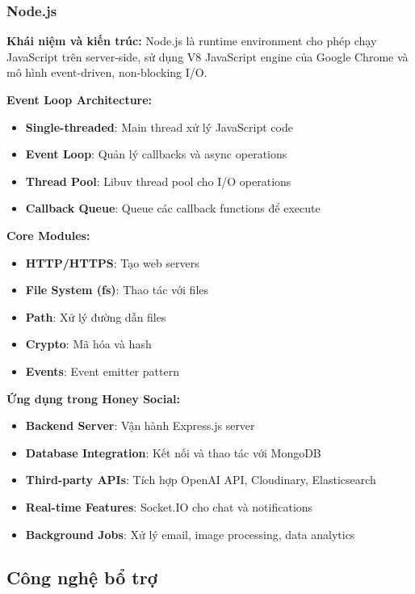 \subsubsection{Node.js}
\textbf{Khái niệm và kiến trúc:}
Node.js là runtime environment cho phép chạy JavaScript trên server-side, sử dụng V8 JavaScript engine của Google Chrome và mô hình event-driven, non-blocking I/O.

\textbf{Event Loop Architecture:}
\begin{itemize}
\item \textbf{Single-threaded}: Main thread xử lý JavaScript code
\item \textbf{Event Loop}: Quản lý callbacks và async operations
\item \textbf{Thread Pool}: Libuv thread pool cho I/O operations
\item \textbf{Callback Queue}: Queue các callback functions để execute
\end{itemize}

\textbf{Core Modules:}
\begin{itemize}
\item \textbf{HTTP/HTTPS}: Tạo web servers
\item \textbf{File System (fs)}: Thao tác với files
\item \textbf{Path}: Xử lý đường dẫn files
\item \textbf{Crypto}: Mã hóa và hash
\item \textbf{Events}: Event emitter pattern
\end{itemize}

\textbf{Ứng dụng trong Honey Social:}
\begin{itemize}
\item \textbf{Backend Server}: Vận hành Express.js server
\item \textbf{Database Integration}: Kết nối và thao tác với MongoDB
\item \textbf{Third-party APIs}: Tích hợp OpenAI API, Cloudinary, Elasticsearch
\item \textbf{Real-time Features}: Socket.IO cho chat và notifications
\item \textbf{Background Jobs}: Xử lý email, image processing, data analytics
\end{itemize}

\subsection{Công nghệ bổ trợ}

